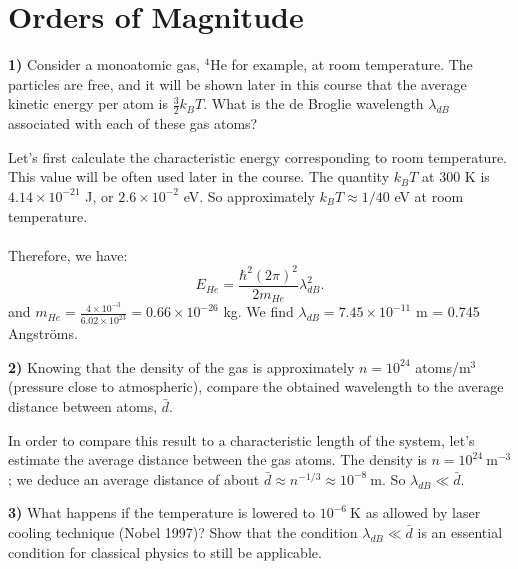 \section{Orders of Magnitude}

\noindent \textbf{1)} Consider a monoatomic gas, ${ }^4 \mathrm{He}$ for example, at room temperature. The particles are free, and it will be shown later in this course that the average kinetic energy per atom is $\displaystyle \frac{3}{2} k_B T$. What is the de Broglie wavelength $\lambda_{dB}$ associated with each of these gas atoms?\\

\begin{breakbox}
    \noindent Let's first calculate the characteristic energy corresponding to room temperature. This value will be often used later in the course. The quantity $k_BT$ at 300 K is $4.14 \times 10^{-21}$ J, or $2.6 \times 10^{-2}$ eV. So approximately $k_BT \approx 1/40$ eV at room temperature.\\ \\
    \noindent Therefore, we have:
    $$\boxed{E_{He} = \frac{\hbar^2(2\pi)^2}{2m_{He}}{\lambda_{dB}^2}.}$$  
    \noindent and $m_{He} = \frac{4 \times 10^{-3}}{6.02 \times 10^{23}} = 0.66 \times 10^{-26}$ kg. We find $\lambda_{dB} = 7.45 \times 10^{-11}$ m = 0.745 Angströms.
\end{breakbox}

\medskip

\noindent \textbf{2)} Knowing that the density of the gas is approximately $n=10^{24}$ atoms/$\mathrm{m}^3$ (pressure close to atmospheric), compare the obtained wavelength to the average distance between atoms, $\bar{d}$.\\

\begin{breakbox}
    \noindent In order to compare this result to a characteristic length of the system, let's estimate the average distance between the gas atoms. The density is $n = 10^{24}\ \mathrm{m}^{-3}$; we deduce an average distance of about $\displaystyle \boxed{\bar{d} \approx n^{-1/3} \approx 10^{-8}\ \mathrm{m}.}$ So $\lambda_{dB} \ll \bar{d}$.
\end{breakbox}

\medskip

\noindent \textbf{3)} What happens if the temperature is lowered to $10^{-6} \mathrm{~K}$ as allowed by laser cooling technique (Nobel 1997)? Show that the condition $\lambda_{dB} \ll \bar{d}$ is an essential condition for classical physics to still be applicable.\\

